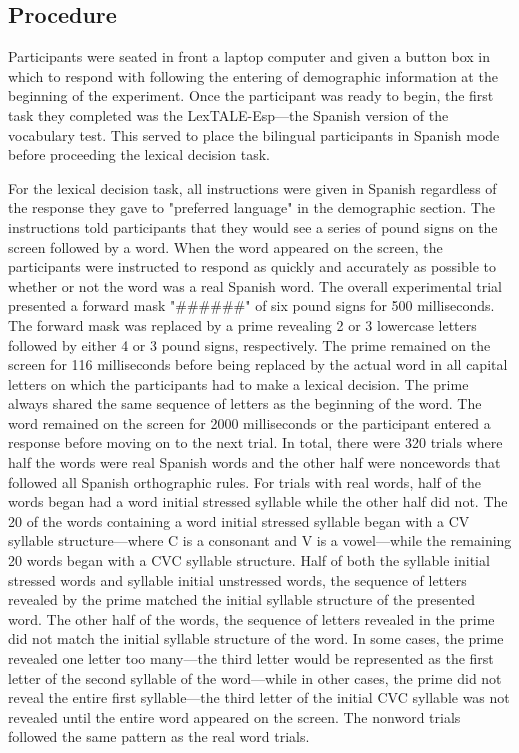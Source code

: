 \subsection{Procedure}

Participants were seated in front a laptop computer and given a button box in which to respond with following the entering of demographic information at the beginning of the experiment. Once the participant was ready to begin, the first task they completed was the LexTALE-Esp---the Spanish version of the vocabulary test. This served to place the bilingual participants in Spanish mode before proceeding the lexical decision task.

For the lexical decision task, all instructions were given in Spanish regardless of the response they gave to "preferred language" in the demographic section. The instructions told participants that they would see a series of pound signs on the screen followed by a word. When the word appeared on the screen, the participants were instructed to respond as quickly and accurately as possible to whether or not the word was a real Spanish word. The overall experimental trial presented a forward mask "\#\#\#\#\#\#" of six pound signs for 500 milliseconds. The forward mask was replaced by a prime revealing 2 or 3 lowercase letters followed by either 4 or 3 pound signs, respectively. The prime remained on the screen for 116 milliseconds before being replaced by the actual word in all capital letters on which the participants had to make a lexical decision. The prime always shared the same sequence of letters as the beginning of the word. The word remained on the screen for 2000 milliseconds or the participant entered a response before moving on to the next trial. In total, there were 320 trials where half the words were real Spanish words and the other half were noncewords that followed all Spanish orthographic rules. For trials with real words, half of the words began had a word initial stressed syllable while the other half did not. The 20 of the words containing a word initial stressed syllable began with a CV syllable structure---where C is a consonant and V is a vowel---while the remaining 20 words began with a CVC syllable structure. Half of both the syllable initial stressed words and syllable initial unstressed words, the sequence of letters revealed by the prime matched the initial syllable structure of the presented word. The other half of the words, the sequence of letters revealed in the prime did not match the initial syllable structure of the word. In some cases, the prime revealed one letter too many---the third letter would be represented as the first letter of the second syllable of the word---while in other cases, the prime did not reveal the entire first syllable---the third letter of the initial CVC syllable was not revealed until the entire word appeared on the screen. The nonword trials followed the same pattern as the real word trials.

